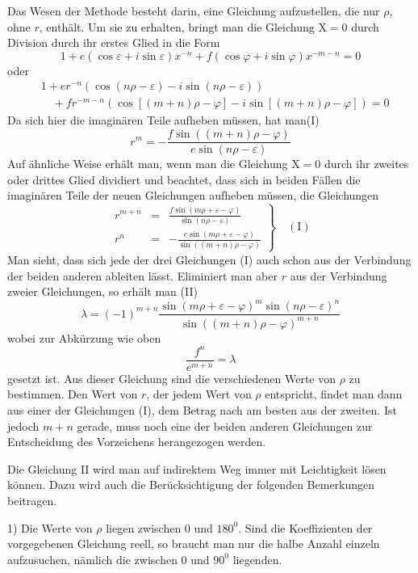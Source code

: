 Das Wesen der Methode besteht darin, eine Gleichung aufzustellen, die nur $\rho$, ohne $r$, enthält. Um sie zu erhalten, bringt man die Gleichung $\mathrm{X}=0$ durch Division durch ihr erstes Glied in die Form
\[
1+e(\cos\varepsilon+i\sin\varepsilon)x^{-n}+f(\cos\varphi+i\sin\varphi)x^{-m-n}=0
\]
oder
\[
\begin{aligned}&1+er^{-n}(\cos(n\rho-\varepsilon)-i\sin(n\rho-\varepsilon))\\
&\quad+fr^{-m-n}(\cos[(m+n)\rho-\varphi]-i\sin[(m+n)\rho-\varphi])=0\end{aligned}
\]
Da sich hier die imaginären Teile aufheben müssen, hat man\nobreak\hspace{.5em}(I)
\[
r^m=-\frac{f\sin((m+n)\rho-\varphi)}{e\sin(n\rho-\varepsilon)}
\]
Auf ähnliche Weise erhält man, wenn man die Gleichung $\mathrm{X}=0$ durch ihr zweites oder drittes Glied dividiert und beachtet, dass sich in beiden Fällen die imaginären Teile der neuen Gleichungen aufheben müssen, die Gleichungen
\[
\left.
\begin{array}{rcl}
r^{m+n}&=&\displaystyle\frac{f\sin(m\rho+\varepsilon-\varphi)}{\sin(n\rho-\varepsilon)}\\[1.2ex]
r^n&=&\displaystyle-\frac{e\sin(m\rho+\varepsilon-\varphi)}{\sin((m+n)\rho-\varphi)}
\end{array}
\right\}\quad\mathrm{(I)}
\]
Man sieht, dass sich jede der drei Gleichungen (I) auch schon aus der Verbindung der beiden anderen ableiten lässt. Eliminiert man aber $r$ aus der Verbindung zweier Gleichungen, so erhält man (II)
\[
\lambda=(-1)^{m+n}\frac{\sin(m\rho+\varepsilon-\varphi)^m\sin(n\rho-\varepsilon)^n}{\sin((m+n)\rho-\varphi)^{m+n}}
\]
wobei zur Abkürzung wie oben
\[
\frac{f^n}{e^{m+n}}=\lambda
\]
gesetzt ist. Aus dieser Gleichung sind die verschiedenen Werte von $\rho$ zu bestimmen. Den Wert von $r$, der jedem Wert von $\rho$ entspricht, findet man dann aus einer der Gleichungen (I), dem Betrag nach am besten aus der zweiten. Ist jedoch $m+n$ gerade, muss noch eine der beiden anderen Gleichungen zur Entscheidung des Vorzeichens herangezogen werden.

Die Gleichung II wird man auf indirektem Weg immer mit Leichtigkeit lösen können. Dazu wird auch die Berücksichtigung der folgenden Bemerkungen beitragen.

1) Die Werte von $\rho$ liegen zwischen $0$ und $180^{0}$. Sind die Koeffizienten der vorgegebenen Gleichung reell, so braucht man nur die halbe Anzahl einzeln aufzusuchen, nämlich die zwischen $0$ und $90^{0}$ liegenden.

